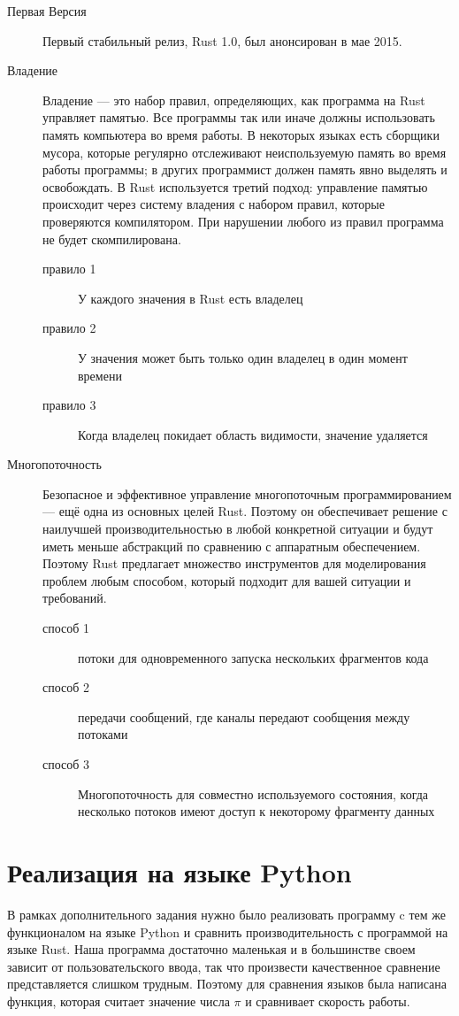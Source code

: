 \documentclass[a4paper,12pt]{article}
\begin{document}
\begin{description}
  \item[Первая Версия] Первый стабильный релиз, Rust 1.0, был анонсирован в мае 2015.
  \item[Владение] Владение — это набор правил, определяющих,
   как программа на Rust управляет памятью. Все программы так 
   или иначе должны использовать память компьютера во время работы.
   В некоторых языках есть сборщики мусора, которые регулярно
   отслеживают неиспользуемую память во время работы программы;
   в других программист должен память явно выделять и освобождать.
   В Rust используется третий подход: управление памятью происходит
   через систему владения с набором правил, которые проверяются
   компилятором. При нарушении любого из правил программа не будет
   скомпилирована.
   \begin{description}
    \item[правило 1] У каждого значения в Rust есть владелец
    \item[правило 2] У значения может быть только один владелец в один момент времени
    \item[правило 3] Когда владелец покидает область видимости, значение удаляется 
   \end{description}
  
  \item[Многопоточность] Безопасное и эффективное управление многопоточным
   программированием — ещё одна из основных целей Rust. Поэтому он обеспечивает
    решение с наилучшей производительностью в любой конкретной ситуации и будут
     иметь меньше абстракций по сравнению с аппаратным обеспечением. Поэтому
      Rust предлагает множество инструментов для моделирования проблем любым
       способом, который подходит для вашей ситуации и требований.
    \begin{description}
    \item[способ 1] потоки для одновременного запуска нескольких фрагментов кода
    \item[способ 2] передачи сообщений, где каналы передают сообщения между потоками
    \item[способ 3] Многопоточность для совместно используемого состояния,
     когда несколько потоков имеют доступ к некоторому фрагменту данных
    \end{description}


\end{description}
\newpage

\section{Реализация на языке Python}
В рамках дополнительного задания нужно было реализовать программу c тем же функционалом на языке Python и сравнить
производительность с программой на языке Rust. Наша программа достаточно маленькая и в большинстве своем зависит от пользовательского
ввода, так что произвести качественное сравнение представляется слишком трудным.
Поэтому для сравнения языков была написана функция, которая считает значение числа $ \pi $ и сравнивает скорость работы.
\end{document}
